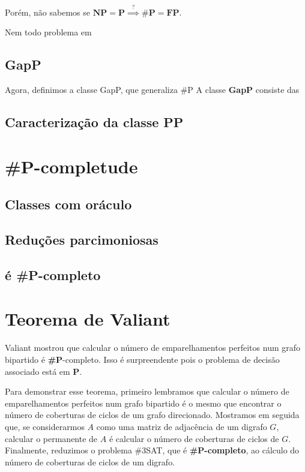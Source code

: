 \documentclass[paper=a4, fontsize=11pt]{scrartcl} %
\numberwithin{equation}{section} %
\numberwithin{figure}{section} %
\numberwithin{table}{section} %
\numberwithin{definition}{section}
\numberwithin{theorem}{section}
\renewcommand{\P}{\textbf{P}\xspace}
\newcommand{\SP}{\textbf{\#P}\xspace}
\newcommand{\NP}{\textbf{NP}\xspace}
\newcommand{\FP}{\textbf{FP}\xspace}
\newcommand{\PP}{\textbf{PP}\xspace}
\newcommand{\gP}{\textbf{GapP}\xspace}
\newcommand{\SPc}{\textbf{\#P-completo}\xspace}
\newcommand{\prob}[1]{\text{\textsc{\textbf{#1}}}}
\begin{document}
Porém, não sabemos se $\NP = \P \stackrel{?}{\implies} \SP = \FP$.

Nem todo problema em 

\subsection{\gP}

Agora, definimos a classe GapP, que generaliza \#P
A classe \gP consiste das 


\subsection{Caracterização da classe \PP}

\pagebreak
\section{\SP-completude}

\subsection{Classes com oráculo}
\subsection{Reduções parcimoniosas}
\subsection{\prob{\#SAT} é \SPc}


\pagebreak
\section{Teorema de Valiant}

Valiant mostrou que calcular o número de emparelhamentos perfeitos num grafo bipartido é \SP-completo. Isso é surpreendente pois o problema de decisão associado está em \P. 

Para demonstrar esse teorema, primeiro lembramos que calcular o número de emparelhamentos perfeitos num grafo bipartido é o mesmo que encontrar o número de coberturas de ciclos de um grafo direcionado. Mostramos em seguida que, se considerarmos $A$ como uma matriz de adjacência de um digrafo $G$, calcular o permanente de $A$ é calcular o número de coberturas de ciclos de $G$. Finalmente, reduzimos o problema \#3SAT, que é \SPc, ao cálculo do número de coberturas de ciclos de um digrafo.
\end{document}
